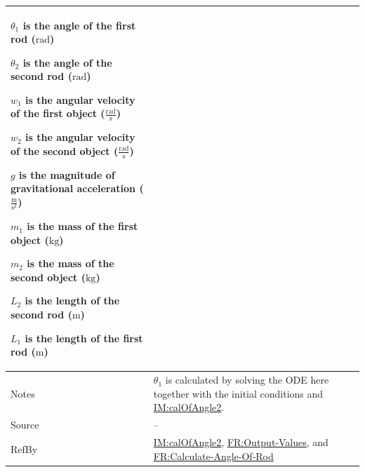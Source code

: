 \documentclass[12pt]{article}
\begin{document}
\begin{minipage}{\textwidth}
\begin{tabular}{>{\raggedright}p{}>{\raggedright\arraybackslash}p{}}
\begin{symbDescription}
              \item{${θ_{1}}$ is the angle of the first rod (${\text{rad}}$)}
              \item{${θ_{2}}$ is the angle of the second rod (${\text{rad}}$)}
              \item{${w_{1}}$ is the angular velocity of the first object ($\frac{\text{rad}}{\text{s}}$)}
              \item{${w_{2}}$ is the angular velocity of the second object ($\frac{\text{rad}}{\text{s}}$)}
              \item{$g$ is the magnitude of gravitational acceleration ($\frac{\text{m}}{\text{s}^{2}}$)}
              \item{${m_{1}}$ is the mass of the first object (${\text{kg}}$)}
              \item{${m_{2}}$ is the mass of the second object (${\text{kg}}$)}
              \item{${L_{2}}$ is the length of the second rod (${\text{m}}$)}
              \item{${L_{1}}$ is the length of the first rod (${\text{m}}$)}
              \end{symbDescription}
\\ \midrule
Notes & ${θ_{1}}$ is calculated by solving the ODE here together with the initial conditions and \hyperref[IM:calOfAngle2]{IM:calOfAngle2}.
        
\\ \midrule
Source & --
         
\\ \midrule
RefBy & \hyperref[IM:calOfAngle2]{IM:calOfAngle2}, \hyperref[outputValues]{FR:Output-Values}, and \hyperref[calcAng]{FR:Calculate-Angle-Of-Rod}
        
\\ \bottomrule
\end{tabular}
\end{minipage}
\end{document}
